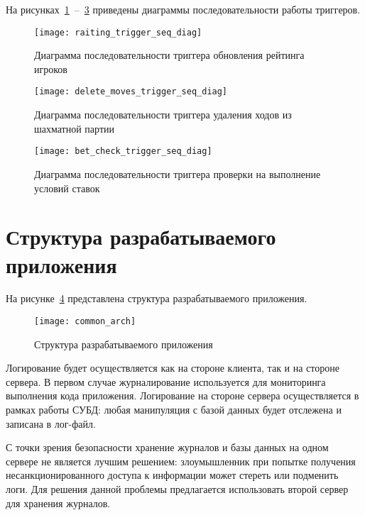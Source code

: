 На рисунках~\ref{raiting_trigger_seq_diag}~--~\ref{bet_check_trigger_seq_diag} приведены диаграммы последовательности работы триггеров.
\begin{figure}[H]
	\centering
	\texttt{[image: raiting\_trigger\_seq\_diag]}
	\caption{Диаграмма последовательности триггера обновления рейтинга игроков}
	\label{raiting_trigger_seq_diag}
\end{figure}
\begin{figure}[H]
	\centering
	\texttt{[image: delete\_moves\_trigger\_seq\_diag]}
	\caption{Диаграмма последовательности триггера удаления ходов из шахматной партии}
	\label{delete_moves_trigger_seq_diag}
\end{figure}
\begin{figure}[H]
	\centering
	\texttt{[image: bet\_check\_trigger\_seq\_diag]}
	\caption{Диаграмма последовательности триггера проверки на выполнение условий ставок}
	\label{bet_check_trigger_seq_diag}
\end{figure}

\section{Структура разрабатываемого приложения}

На рисунке~\ref{common_arch} представлена структура разрабатываемого приложения.
\begin{figure}[H]
	\centering
	\texttt{[image: common\_arch]}
	\caption{Структура разрабатываемого приложения}
	\label{common_arch}
\end{figure}

Логирование будет осуществляется как на стороне клиента, так и на стороне сервера. В первом случае журналирование используется для мониторинга выполнения кода приложения.
Логирование на стороне сервера осуществляется в рамках работы СУБД: любая манипуляция с базой данных будет отслежена и записана в лог-файл.

С точки зрения безопасности хранение журналов и базы данных на одном сервере не является лучшим решением: злоумышленник при попытке получения несанкционированного доступа к информации может стереть или подменить логи.
Для решения данной проблемы предлагается использовать второй сервер для хранения журналов.

